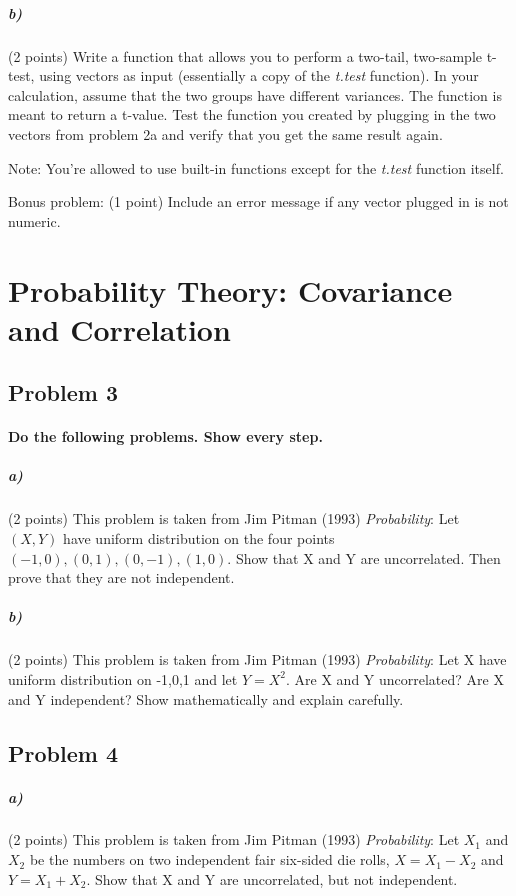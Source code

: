 \documentclass[12pt,letter]{article}
\begin{document}
\subparagraph{b)} (2 points) Write a function that allows you to perform a two-tail, two-sample t-test, using vectors as input (essentially a copy of the \textit{t.test} function). In your calculation, assume that the two groups have different variances. The function is meant to return a t-value. Test the function you created by plugging in the two vectors from problem 2a and verify that you get the same result again.

Note: You're allowed to use built-in functions except for the \textit{t.test} function itself.

\bigskip

Bonus problem: (1 point) Include an error message if any vector plugged in is not numeric.



\pagebreak

\section*{Probability Theory: Covariance and Correlation}

\subsection*{Problem 3}

\paragraph{Do the following problems. Show every step.}

\subparagraph{a)} (2 points) This problem is taken from Jim Pitman (1993) \textit{Probability}: Let $(X,Y)$ have uniform distribution on the four points $(-1,0), (0,1), (0,-1), (1,0)$. Show that X and Y are uncorrelated. Then prove that they are not independent. %

\subparagraph{b)} (2 points) This problem is taken from Jim Pitman (1993) \textit{Probability}: Let X have uniform distribution on {-1,0,1} and let $Y=X^2$. Are X and Y uncorrelated? Are X and Y independent? Show mathematically and explain carefully. %



\subsection*{Problem 4}

\subparagraph{a)} (2 points) This problem is taken from Jim Pitman (1993) \textit{Probability}: Let $X_{1}$ and $X_{2} $ be the numbers on two independent fair six-sided die rolls, $X = X_{1} - X_{2}$ and $Y= X_{1} + X_{2}$. Show that X and Y are uncorrelated, but not independent. %
\end{document}
